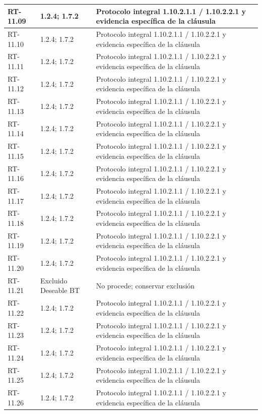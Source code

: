 \begin{longtable}{L{23mm}L{46mm}L{72mm}}
RT-11.09 & 1.2.4; 1.7.2 & Protocolo integral 1.10.2.1.1 / 1.10.2.2.1 y evidencia específica de la cláusula\\\hline
RT-11.10 & 1.2.4; 1.7.2 & Protocolo integral 1.10.2.1.1 / 1.10.2.2.1 y evidencia específica de la cláusula\\\hline
RT-11.11 & 1.2.4; 1.7.2 & Protocolo integral 1.10.2.1.1 / 1.10.2.2.1 y evidencia específica de la cláusula\\\hline
RT-11.12 & 1.2.4; 1.7.2 & Protocolo integral 1.10.2.1.1 / 1.10.2.2.1 y evidencia específica de la cláusula\\\hline
RT-11.13 & 1.2.4; 1.7.2 & Protocolo integral 1.10.2.1.1 / 1.10.2.2.1 y evidencia específica de la cláusula\\\hline
RT-11.14 & 1.2.4; 1.7.2 & Protocolo integral 1.10.2.1.1 / 1.10.2.2.1 y evidencia específica de la cláusula\\\hline
RT-11.15 & 1.2.4; 1.7.2 & Protocolo integral 1.10.2.1.1 / 1.10.2.2.1 y evidencia específica de la cláusula\\\hline
RT-11.16 & 1.2.4; 1.7.2 & Protocolo integral 1.10.2.1.1 / 1.10.2.2.1 y evidencia específica de la cláusula\\\hline
RT-11.17 & 1.2.4; 1.7.2 & Protocolo integral 1.10.2.1.1 / 1.10.2.2.1 y evidencia específica de la cláusula\\\hline
RT-11.18 & 1.2.4; 1.7.2 & Protocolo integral 1.10.2.1.1 / 1.10.2.2.1 y evidencia específica de la cláusula\\\hline
RT-11.19 & 1.2.4; 1.7.2 & Protocolo integral 1.10.2.1.1 / 1.10.2.2.1 y evidencia específica de la cláusula\\\hline
RT-11.20 & 1.2.4; 1.7.2 & Protocolo integral 1.10.2.1.1 / 1.10.2.2.1 y evidencia específica de la cláusula\\\hline
RT-11.21 & Excluido Deseable BT & No procede; conservar exclusión\\\hline
RT-11.22 & 1.2.4; 1.7.2 & Protocolo integral 1.10.2.1.1 / 1.10.2.2.1 y evidencia específica de la cláusula\\\hline
RT-11.23 & 1.2.4; 1.7.2 & Protocolo integral 1.10.2.1.1 / 1.10.2.2.1 y evidencia específica de la cláusula\\\hline
RT-11.24 & 1.2.4; 1.7.2 & Protocolo integral 1.10.2.1.1 / 1.10.2.2.1 y evidencia específica de la cláusula\\\hline
RT-11.25 & 1.2.4; 1.7.2 & Protocolo integral 1.10.2.1.1 / 1.10.2.2.1 y evidencia específica de la cláusula\\\hline
RT-11.26 & 1.2.4; 1.7.2 & Protocolo integral 1.10.2.1.1 / 1.10.2.2.1 y evidencia específica de la cláusula\\\hline

\end{longtable}
